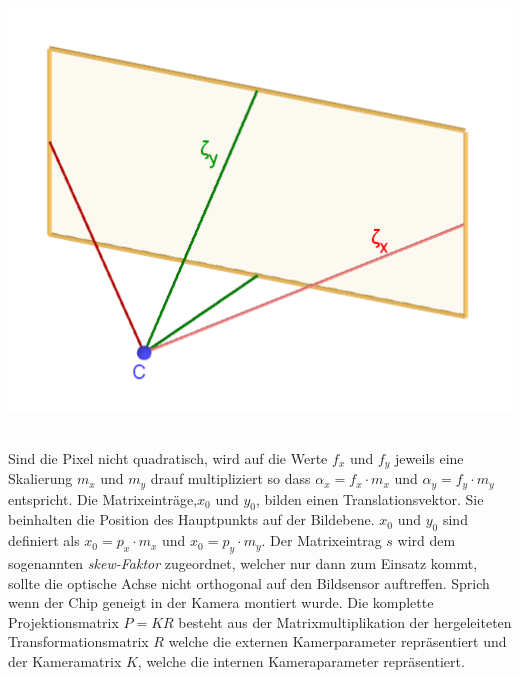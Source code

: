 \begin{minipage}{\linewidth}
	\centering
	\includegraphics[width=.6\linewidth]{images/FocalLengthExplanation.png}
	\label{fig:focalLengthErklaerung}
\end{minipage}\\


Sind die Pixel nicht quadratisch, wird auf die Werte $f_x$ und $f_y$ jeweils eine Skalierung $m_x$ und $m_y$ drauf multipliziert so dass  $\alpha_x = f_x \cdot m_x$ und $\alpha_y = f_y \cdot m_y$ entspricht\cite{HZ}. Die Matrixeinträge,$x_{0}$ und $y_{0}$, bilden einen Translationsvektor. Sie beinhalten die Position des Hauptpunkts auf der Bildebene. $x_{0}$ und $y_{0}$ sind definiert als $x_{0} = p_x \cdot m_x$ und $x_{0} = p_y \cdot m_y$. Der Matrixeintrag $s$ wird dem sogenannten \textit{skew-Faktor} zugeordnet, welcher nur dann zum Einsatz kommt, sollte die optische Achse nicht orthogonal auf den Bildsensor auftreffen. Sprich wenn der Chip geneigt in der Kamera montiert wurde\cite{HZ}. Die komplette Projektionsmatrix $P=KR$\cite{HZ} besteht aus der Matrixmultiplikation der hergeleiteten Transformationsmatrix $R$ welche die externen Kamerparameter repräsentiert und der Kameramatrix $K$, welche die internen Kameraparameter repräsentiert\cite{HZ,ZZGXr}.


